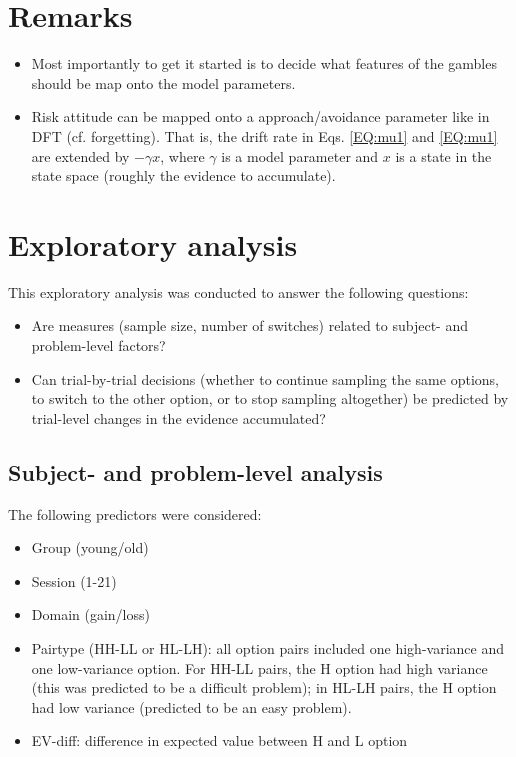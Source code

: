 \documentclass[english,doc]{apa}
\begin{document}
\section{Remarks}
\begin{itemize}
\item Most importantly to get it started is to decide what features of the gambles should be  map onto the model parameters. 
\item Risk attitude can be mapped onto a approach/avoidance parameter like in DFT (cf. forgetting). That is, the drift rate in Eqs. \ref{EQ:mu1} and \ref{EQ:mu1} are extended by $-\gamma x$, where $\gamma$ is a model parameter and $x$ is a state in the state space (roughly the evidence to accumulate). 
\end{itemize}



\section{Exploratory analysis}

This exploratory analysis was conducted to answer the following questions:

\begin{itemize}
\item Are measures (sample size, number of switches) related to subject- and problem-level factors?
\item Can trial-by-trial decisions (whether to continue sampling the same options, to switch to the other option, or to stop sampling altogether) be predicted by trial-level changes in the evidence accumulated?	
\end{itemize}




\subsection{Subject- and problem-level analysis}

The following predictors were considered:

\begin{itemize}
\item Group (young/old)
\item Session (1-21)
\item Domain (gain/loss)
\item Pairtype (HH-LL or HL-LH): all option pairs included one high-variance and one low-variance option. For HH-LL pairs, the H option had high variance (this was predicted to be a difficult problem); in HL-LH pairs, the H option had low variance (predicted to be an easy problem).
\item EV-diff: difference in expected value between H and L option
\end{itemize}
\end{document}

